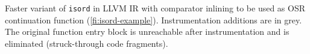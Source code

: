 \label{fig:isordascto} Faster variant of {\tt isord} in LLVM IR with comparator inlining to be used as OSR continuation function (\myfigure\ref{fi:isord-example}). Instrumentation additions are in grey. The original function entry block is unreachable after instrumentation and is eliminated (struck-through code fragments).